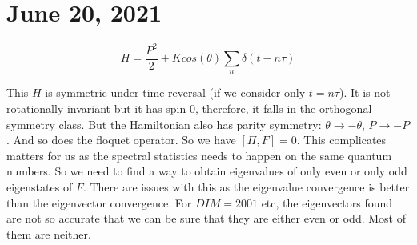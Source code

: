 \documentclass[12pt]{article}
\begin{document}
\newpage
\section{June 20, 2021}

\begin{equation}
    H = \frac{P^2}{2} + K cos(\theta) \sum_{n} \delta (t - n\tau)
\end{equation}

This $H$ is symmetric under time reversal (if we consider only $t = n\tau$).
It is not rotationally invariant but it has spin 0, therefore, it falls in the
orthogonal symmetry class. But the Hamiltonian also has parity symmetry:
$\theta \to -\theta$, $P \to -P$. And so does the floquet operator. So we have
$[\Pi, F] = 0$. This complicates matters for us as the spectral statistics
needs to happen on the same quantum numbers. So we need to find a way to obtain
eigenvalues of only even or only odd eigenstates of $F$. There are issues with
this as the eigenvalue convergence is better than the eigenvector
convergence. For $DIM = 2001$ etc, the eigenvectors found are not so accurate
that we can be sure that they are either even or odd. Most of them are neither.

\nocite{*}
\printbibliography
\end{document}

